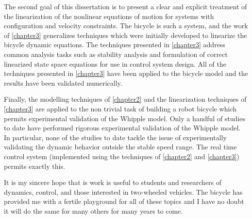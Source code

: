 The second goal of this dissertation is to present a clear and explicit
treatment of the linearization of the nonlinear equations of motion for systems
with configuration and velocity constraints. The bicycle is such a system, and
the work of \autoref{chapter3} generalizes techniques which were initially
developed to linearize the bicycle dynamic equations. The techniques presented
in \autoref{chapter3} address common analysis tasks such as stability analysis
and formulation of correct linearized state space equations for use in control
system design. All of the techniques presented in \autoref{chapter3} have been
applied to the bicycle model and the results have been validated numerically.

Finally, the modelling techniques of \autoref{chapter2} and the linearization
techniques of \autoref{chapter3} are applied to the non trivial task of
building a robot bicycle which permits experimental validation of the Whipple
model. Only a handful of studies to date have performed rigorous experimental
validation of the Whipple model. In particular, none of the studies to date
tackle the issue of experimentally validating the dynamic behavior outside the
stable speed range. The real time control system (implemented using the
techniques of \autoref{chapter2} and \autoref{chapter3}) permits exactly this.

It is my sincere hope that is work is useful to students and researchers of
dynamics, control, and those interested in two-wheeled vehicles. The bicycle
has provided me with a fertile playground for all of these topics and I have no
doubt it will do the same for many others for many years to come.
